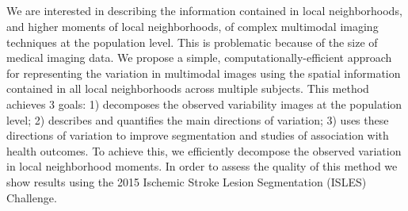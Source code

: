 \documentclass[a0,landscape]{a0poster}
\begin{document}
\vspace{1cm} %


\begin{multicols}{3} %


\color{black} %

\normalsize{\section*{}}
\hspace{1cm}We are interested in describing the information contained in local neighborhoods, and higher moments of local neighborhoods, of complex multimodal imaging techniques at the population level. This is problematic because of the size of medical imaging data. We propose a simple, computationally-efficient approach for representing the variation in multimodal images using the spatial information contained in all local neighborhoods across multiple subjects. This method achieves 3 goals: 1) decomposes the observed variability images at the population level; 2) describes and quantifies the main directions of variation; 3) uses these directions of variation to improve segmentation and studies of association with health outcomes. To achieve this, we efficiently decompose the observed variation in local neighborhood moments. In order to assess the quality of this method we show results using the 2015 Ischemic Stroke Lesion Segmentation (ISLES) Challenge.\vspace{.5cm}



\end{multicols}
\end{document}
